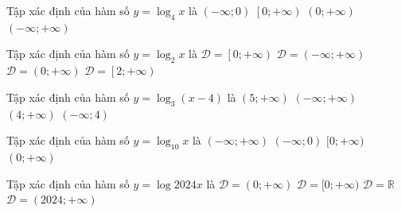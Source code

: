 \begin{ex}%
	Tập xác định của hàm số $y  = \log_{4}{x}$ là
	 \choice
		{$\left(-\infty; 0 \right)$} 
		 {$\left[0; +\infty\right)$}
		{\True $\left(0; +\infty\right)$} 
		{$\left(-\infty; +\infty\right)$} 
\end{ex}

\begin{ex}%
	Tập xác định  của hàm số $y={\log }_2x$ là
	\choice 
		 {$\mathscr{D}=\left[0;+\infty \right)$}
		{$\mathscr{D}=\left(  -\infty;+\infty \right)$}
		{\True $\mathscr{D}=\left(  0;+\infty \right)$}
		{$\mathscr{D}=\left[2;+\infty \right)$} 
\end{ex}

\begin{ex}%
	Tập xác định của hàm số  $y=\log_3 \left(x-4\right)$ là
	\choice 
		 {$\left(5;+\infty \right)$}
		 {$\left(-\infty;+\infty \right)$}
		 {\True $\left(4;+\infty \right)$}
		 {$\left(-\infty;4\right)$}
\end{ex}

\begin{ex}%
	Tập xác định của hàm số $  y=\log_{10} x $ là
	 \choice
		{$ (-\infty;+\infty)  $}
		{$ (-\infty;0) $} 
		 {$ [0;+\infty) $}
		{\True  $ (0;+\infty) $}
\end{ex}

\begin{ex}%
	 Tập xác định của hàm số $y=\log 2024x$ là
	\choice 
		{\True  $\mathscr{D}=(0;+\infty)$}
		{$\mathscr{D}=[0;+\infty)$} 
		 {$\mathscr{D}=\mathbb{R}$}
		{$\mathscr{D}=(2024;+\infty)$} 
\end{ex}

